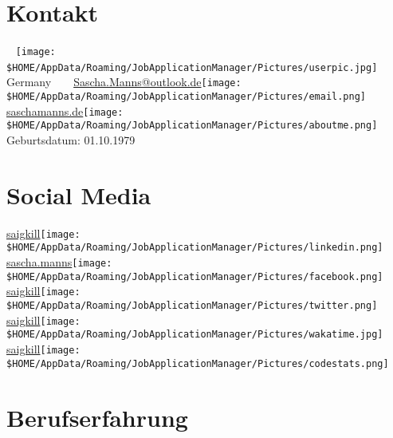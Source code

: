 \documentclass[a4paper]{friggeri-cv} %
\begin{document}


\begin{aside} %
\section{Kontakt}
~
\texttt{[image: \$HOME/AppData/Roaming/JobApplicationManager/Pictures/userpic.jpg]}
~
\mystreet
\mycity
Germany
~
\myphone
~
\href{mailto:Sascha.Manns@outlook.de}{Sascha.Manns@outlook.de}\texttt{[image: \$HOME/AppData/Roaming/JobApplicationManager/Pictures/email.png]}
\href{http://saschamanns.de}{saschamanns.de}\texttt{[image: \$HOME/AppData/Roaming/JobApplicationManager/Pictures/aboutme.png]}
Geburtsdatum: 01.10.1979
\section{Social Media}
\href{https://www.linkedin.com/in/saigkill}{saigkill}\texttt{[image: \$HOME/AppData/Roaming/JobApplicationManager/Pictures/linkedin.png]}
\href{https://www.facebook.com/sascha.manns}{sascha.manns}\texttt{[image: \$HOME/AppData/Roaming/JobApplicationManager/Pictures/facebook.png]}
\href{https://twitter.com/saigkill}{saigkill}\texttt{[image: \$HOME/AppData/Roaming/JobApplicationManager/Pictures/twitter.png]}
\href{https://wakatime.com/@saigkill}{saigkill}\texttt{[image: \$HOME/AppData/Roaming/JobApplicationManager/Pictures/wakatime.jpg]}
\href{https://codestats.net/users/saigkill}{saigkill}\texttt{[image: \$HOME/AppData/Roaming/JobApplicationManager/Pictures/codestats.png]}
\end{aside}


\section{Berufserfahrung}
\end{document}
